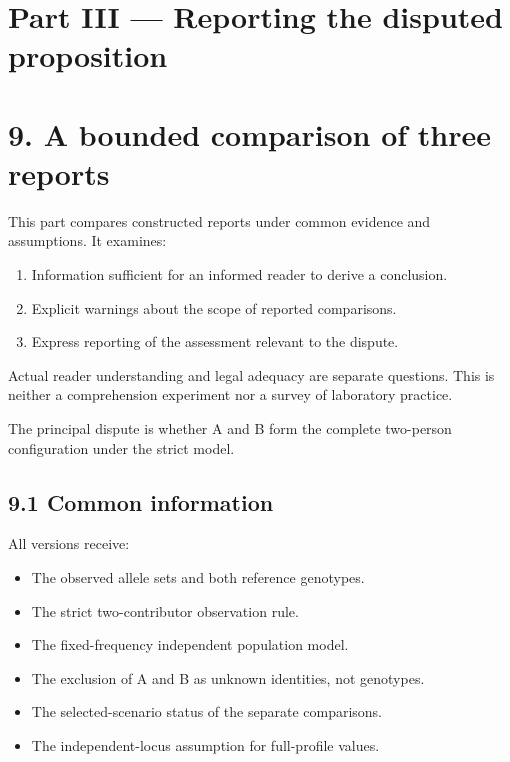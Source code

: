 \documentclass[
]{article}
\providecommand{\tightlist}{%
  \setlength{\itemsep}{0pt}\setlength{\parskip}{0pt}}
\begin{document}
\section{Part III --- Reporting the disputed
proposition}\label{part-iii-reporting-the-disputed-proposition}

\section{9. A bounded comparison of three
reports}\label{a-bounded-comparison-of-three-reports}

This part compares constructed reports under common evidence and
assumptions. It examines:

\begin{enumerate}
\def\labelenumi{\arabic{enumi}.}
\tightlist
\item
  Information sufficient for an informed reader to derive a conclusion.
\item
  Explicit warnings about the scope of reported comparisons.
\item
  Express reporting of the assessment relevant to the dispute.
\end{enumerate}

Actual reader understanding and legal adequacy are separate questions.
This is neither a comprehension experiment nor a survey of laboratory
practice.

The principal dispute is whether A and B form the complete two-person
configuration under the strict model.

\subsection{9.1 Common information}\label{common-information}

All versions receive:

\begin{itemize}
\tightlist
\item
  The observed allele sets and both reference genotypes.
\item
  The strict two-contributor observation rule.
\item
  The fixed-frequency independent population model.
\item
  The exclusion of A and B as unknown identities, not genotypes.
\item
  The selected-scenario status of the separate comparisons.
\item
  The independent-locus assumption for full-profile values.
\end{itemize}
\end{document}
